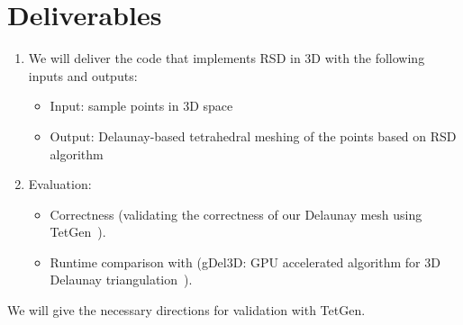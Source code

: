 \documentclass[12pt] {article}
\begin{document}
\section*{Deliverables}

\begin{enumerate}
\item We will deliver the code that implements RSD in 3D with the following inputs and outputs:
\begin{itemize}
\item Input: sample points in 3D space
\item Output: Delaunay-based tetrahedral meshing of the points based on RSD algorithm
\end{itemize}
\item Evaluation:
\begin{itemize}

\item Correctness (validating the correctness of our Delaunay mesh using TetGen~\citep{si2015tetgen}).
\item Runtime comparison with (gDel3D:  GPU accelerated algorithm for 3D Delaunay triangulation~\citep{cao2014gpu}).
\end{itemize}

\end{enumerate}

We will give the necessary directions for validation with TetGen.


\end{document}
